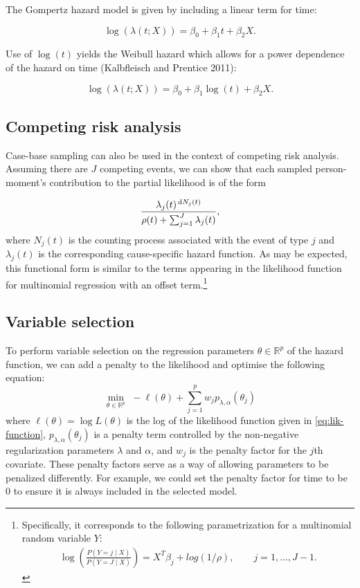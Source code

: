 The Gompertz hazard model is given by including a linear term for time:

\begin{equation}
\log(\lambda(t; X)) = \beta_0 + \beta_1 t + \beta_2 X. \label{eq:gomp}
\end{equation}

Use of \(\log(t)\) yields the Weibull hazard which allows for a power dependence of the hazard on time (Kalbfleisch and Prentice 2011):

\begin{equation}
\log(\lambda(t; X)) = \beta_0 + \beta_1 \log(t) + \beta_2 X. \label{eq:weibull}
\end{equation}

\hypertarget{competing-risk-analysis}{%
\subsection{Competing risk analysis}\label{competing-risk-analysis}}

Case-base sampling can also be used in the context of competing risk analysis. Assuming there are \(J\) competing events, we can show that each sampled person-moment's contribution to the partial likelihood is of the form

\[\frac{\lambda_j(t)^{\,\textrm dN_j(t)}}{\rho(t) + \sum_{j=1}^J\lambda_j(t)},\]
where \(N_j(t)\) is the counting process associated with the event of type \(j\) and \(\lambda_j(t)\) is the corresponding cause-specific hazard function. As may be expected, this functional form is similar to the terms appearing in the likelihood function for multinomial regression with an offset term.\footnote{Specifically, it corresponds to the following parametrization for a multinomial random variable \(Y\): \begin{align*} \log\left(\frac{P(Y=j \mid X)}{P(Y = J \mid X)}\right) = X^T\beta_j + log(1/\rho), \qquad j = 1,\ldots, J-1.\end{align*}}

\hypertarget{variable-selection}{%
\subsection{Variable selection}\label{variable-selection}}

To perform variable selection on the regression parameters \(\theta \in \mathbb{R}^p\) of the hazard function, we can add a penalty to the likelihood and optimise the following equation:
\begin{equation}
\min _{\theta \in \mathbb{R}^{p}}\,\,-\ell\left(\theta\right)+\sum_{j=1}^p w_j p_{\lambda,\alpha}(\theta_j) \label{eq:penest}
\end{equation}
where \(\ell\left(\theta\right) = \log L(\theta)\) is the log of the likelihood function given in \eqref{eq:lik-function}, \(p_{\lambda,\alpha}(\theta_j)\) is a penalty term controlled by the non-negative regularization parameters \(\lambda\) and \(\alpha\), and \(w_j\) is the penalty factor for the \(j\)th covariate. These penalty factors serve as a way of allowing parameters to be penalized differently. For example, we could set the penalty factor for time to be 0 to ensure it is always included in the selected model.


